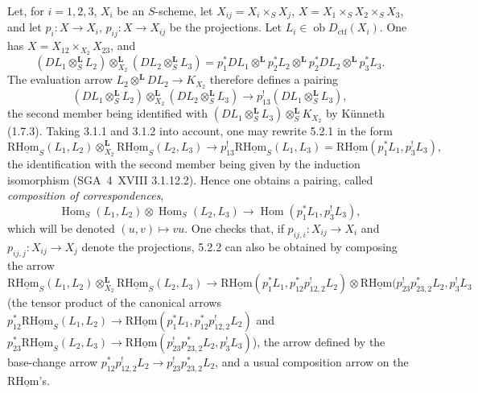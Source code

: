 \documentclass[11pt]{article}
\DeclareMathOperator{\Hom}{Hom}
\providecommand{\Hom}{\operatorname{Hom}}
\providecommand{\Hom}{\operatorname{Hom}}
\begin{document}
Let, for $i=1,2,3$, $X_i$ be an $S$-scheme, let $X_{ij}=X_i\times_SX_j$, $X=X_1\times_SX_2\times_SX_3$, and let $p_i:X\to X_i$, $p_{ij}:X\to X_{ij}$ be the projections. Let $L_i\in\operatorname{ob}D_{\mathrm{ctf}}(X_i)$. One has $X=X_{12}\times_{X_2}X_{23}$, and
\[
(DL_1\otimes_S^{\mathbf L}L_2)\otimes_{X_2}^{\mathbf L}(DL_2\otimes_S^{\mathbf L}L_3)
=p_1^*DL_1\otimes^{\mathbf L}p_2^*L_2\otimes^{\mathbf L}p_2^*DL_2\otimes^{\mathbf L}p_3^*L_3.
\]
The evaluation arrow $L_2\otimes^{\mathbf L}DL_2\to K_{X_2}$ therefore defines a pairing
\begin{equation}
\tag{5.2.1}
(DL_1\otimes_S^{\mathbf L}L_2)\otimes_{X_2}^{\mathbf L}(DL_2\otimes_S^{\mathbf L}L_3)\longrightarrow p_{13}^!(DL_1\otimes_S^{\mathbf L}L_3),
\end{equation}
the second member being identified with $(DL_1\otimes_S^{\mathbf L}L_3)\otimes_S^{\mathbf L}K_{X_2}$ by Künneth (1.7.3). Taking 3.1.1 and 3.1.2 into account, one may rewrite 5.2.1 in the form
\begin{equation}
\tag{5.2.2}
\mathrm{R}\underline{\mathrm{Hom}}_S(L_1,L_2)\otimes_{X_2}^{\mathbf L}\mathrm{R}\underline{\mathrm{Hom}}_S(L_2,L_3)\longrightarrow p_{13}^!\mathrm{R}\underline{\mathrm{Hom}}_S(L_1,L_3)=\mathrm{R}\underline{\mathrm{Hom}}(p_1^*L_1,p_3^!L_3),
\end{equation}
the identification with the second member being given by the induction isomorphism (SGA~4~XVIII 3.1.12.2). Hence one obtains a pairing, called \emph{composition of correspondences},
\begin{equation}
\tag{5.2.3}
\Hom_S(L_1,L_2)\otimes\Hom_S(L_2,L_3)\longrightarrow\Hom(p_1^*L_1,p_3^!L_3),
\end{equation}
which will be denoted $(u,v)\mapsto vu$. One checks that, if $p_{ij,i}:X_{ij}\to X_i$ and $p_{ij,j}:X_{ij}\to X_j$ denote the projections, 5.2.2 can also be obtained by composing the arrow
\[
\mathrm{R}\underline{\mathrm{Hom}}_S(L_1,L_2)\otimes_{X_2}^{\mathbf L}\mathrm{R}\underline{\mathrm{Hom}}_S(L_2,L_3)
\longrightarrow
\mathrm{R}\underline{\mathrm{Hom}}(p_1^*L_1,p_{12}^*p_{12,2}^!L_2)
\otimes
\mathrm{R}\underline{\mathrm{Hom}}(p_{23}^!p_{23,2}^*L_2,p_3^!L_3
\]
(the tensor product of the canonical arrows $p_{12}^*\mathrm{R}\underline{\mathrm{Hom}}_S(L_1,L_2)\to\mathrm{R}\underline{\mathrm{Hom}}(p_1^*L_1,p_{12}^*p_{12,2}^!L_2)$ and $p_{23}^*\mathrm{R}\underline{\mathrm{Hom}}_S(L_2,L_3)\to\mathrm{R}\underline{\mathrm{Hom}}(p_{23}^!p_{23,2}^*L_2,p_3^!L_3)$), the arrow defined by the base-change arrow $p_{12}^*p_{12,2}^!L_2\to p_{23}^!p_{23,2}^*L_2$, and a usual composition arrow on the $\mathrm{R}\underline{\mathrm{Hom}}$'s.
\end{document}
